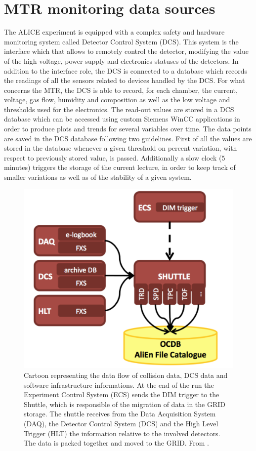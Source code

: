 \section{MTR monitoring data sources}
The ALICE experiment is equipped with a complex safety and hardware monitoring system called Detector Control System (DCS).
This system is the interface which that allows to remotely control the detector, modifying the value of the high voltage, power supply and electronics statuses of the detectors.
In addition to the interface role, the DCS is connected to a database which records the readings of all the sensors related to devices handled by the DCS.
For what concerns the MTR, the DCS is able to record, for each chamber, the current, voltage, gas flow, humidity and composition as well as the low voltage and thresholds used for the electronics.
The read-out values are stored in a DCS database which can be accessed using custom Siemens WinCC applications in order to produce plots and trends for several variables over time.
The data points are saved in the DCS database following two guidelines.
First of all the values are stored in the database whenever a given threshold on percent variation, with respect to previously stored value, is passed.
Additionally a slow clock ($5$ minutes) triggers the storage of the current lecture, in order to keep track of smaller variations as well as of the stability of a given system.

\begin{figure}[!t]
\begin{center}
\includegraphics[width=0.7\linewidth]{Chapters/Performance/Figs/OCDB.png}
\caption{Cartoon representing the data flow of collision data, DCS data and software infrastructure informations. At the end of the run the Experiment Control System (ECS) sends the DIM trigger to the Shuttle, which is responsible of the migration of data in the GRID storage. The shuttle receives from the Data Acquisition System (DAQ), the Detector Control System (DCS) and the High Level Trigger (HLT) the information relative to the involved detectors. The data is packed together and moved to the GRID. From \cite{Zampolli:2010zz}.}
\label{fig:shuttle}
\end{center}
\end{figure}

